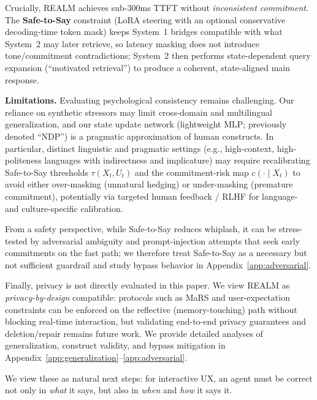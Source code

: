 \documentclass{article}
\begin{document}
Crucially, REALM achieves sub-300ms TTFT without \emph{inconsistent commitment}.
The \textbf{Safe-to-Say} constraint (LoRA steering with an optional conservative decoding-time token mask) keeps System~1 bridges compatible with what System~2 may later retrieve, so latency masking does not introduce tone/commitment contradictions; System~2 then performs state-dependent query expansion (``motivated retrieval'') to produce a coherent, state-aligned main response.

\textbf{Limitations.} Evaluating psychological consistency remains challenging. Our reliance on synthetic stressors may limit cross-domain and multilingual generalization, and our state update network (lightweight MLP; previously denoted ``NDP'') is a pragmatic approximation of human constructs. In particular, distinct linguistic and pragmatic settings (e.g., high-context, high-politeness languages with indirectness and implicature) may require recalibrating Safe-to-Say thresholds $\tau(X_t,U_t)$ and the commitment-risk map $c(\cdot\mid X_t)$ to avoid either over-masking (unnatural hedging) or under-masking (premature commitment), potentially via targeted human feedback / RLHF for language- and culture-specific calibration.

From a safety perspective, while Safe-to-Say reduces whiplash, it can be stress-tested by adversarial ambiguity and prompt-injection attempts that seek early commitments on the fast path; we therefore treat Safe-to-Say as a necessary but not sufficient guardrail and study bypass behavior in Appendix~\ref{app:adversarial}.

Finally, privacy is not directly evaluated in this paper. We view REALM as \emph{privacy-by-design} compatible: protocols such as MaRS \cite{alqithami2025mars} and user-expectation constraints \cite{jones2024userexpectations} can be enforced on the reflective (memory-touching) path without blocking real-time interaction, but validating end-to-end privacy guarantees and deletion/repair remains future work.
We provide detailed analyses of generalization, construct validity, and bypass mitigation in Appendix~\ref{app:generalization}--\ref{app:adversarial}.

We view these as natural next steps: for interactive UX, an agent must be correct not only in \emph{what} it says, but also in \emph{when} and \emph{how} it says it.





\FloatBarrier


\end{document}
